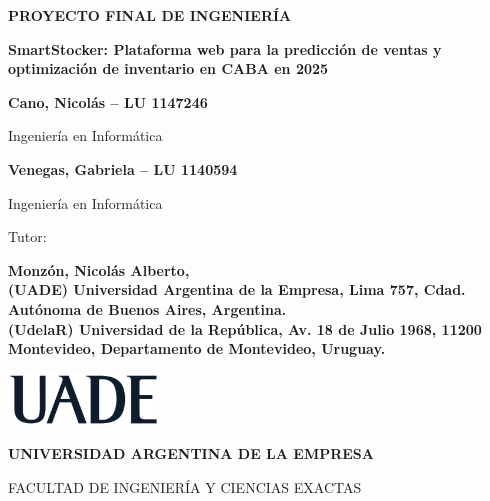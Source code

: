 \begin{titlepage}
    \centering

    {\textbf{\fontsize{18}{20}\selectfont PROYECTO FINAL DE INGENIERÍA} \par}
    \vspace{1.5cm}

    {\textbf{\fontsize{16}{18}\selectfont SmartStocker: Plataforma web para la predicción de ventas y optimización de inventario en CABA en 2025} \par}
    \vspace{0.5cm}

    {\textbf{\fontsize{14}{16}\selectfont Cano, Nicolás -- LU 1147246} \par}
    {\fontsize{14}{16}\selectfont Ingeniería en Informática \par}
    \vspace{1cm}

    {\textbf{\fontsize{14}{16}\selectfont Venegas, Gabriela -- LU 1140594} \par}
    {\fontsize{14}{16}\selectfont Ingeniería en Informática \par}
    \vspace{1.5cm}

    {\fontsize{14}{16}\selectfont Tutor: \par}
    {\textbf{\fontsize{14}{16}\selectfont Monzón, Nicolás Alberto, 
        \\ (UADE) Universidad Argentina de la Empresa, Lima 757, Cdad. Autónoma de Buenos Aires, Argentina.
        \\ (UdelaR) Universidad de la República, Av. 18 de Julio 1968, 11200 Montevideo, Departamento de Montevideo, Uruguay.
    } \par}
    \vspace{3cm}

	{\textbf{\fontsize{14}{16}\selectfont \the\year} \par}
    \vspace{2cm}

    \includegraphics[width=0.30\textwidth]{./images/UADE}\par \vspace{1cm}
    {\textbf{\fontsize{14}{16}\selectfont UNIVERSIDAD ARGENTINA DE LA EMPRESA} \par}
    {\fontsize{14}{16}\selectfont FACULTAD DE INGENIERÍA Y CIENCIAS EXACTAS \par}
\end{titlepage}